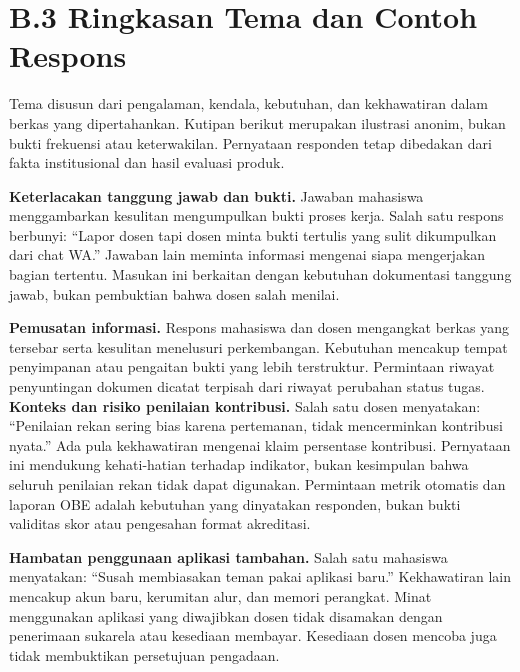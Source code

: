 \documentclass[12pt,a4paper,oneside]{report}
\begin{document}
\section*{B.3 Ringkasan Tema dan Contoh Respons}
Tema disusun dari pengalaman, kendala, kebutuhan, dan kekhawatiran dalam berkas yang dipertahankan. Kutipan berikut merupakan ilustrasi anonim, bukan bukti frekuensi atau keterwakilan. Pernyataan responden tetap dibedakan dari fakta institusional dan hasil evaluasi produk.

\textbf{Keterlacakan tanggung jawab dan bukti.} Jawaban mahasiswa menggambarkan kesulitan mengumpulkan bukti proses kerja. Salah satu respons berbunyi: ``Lapor dosen tapi dosen minta bukti tertulis yang sulit dikumpulkan dari chat WA.'' Jawaban lain meminta informasi mengenai siapa mengerjakan bagian tertentu. Masukan ini berkaitan dengan kebutuhan dokumentasi tanggung jawab, bukan pembuktian bahwa dosen salah menilai.

\textbf{Pemusatan informasi.} Respons mahasiswa dan dosen mengangkat berkas yang tersebar serta kesulitan menelusuri perkembangan. Kebutuhan mencakup tempat penyimpanan atau pengaitan bukti yang lebih terstruktur. Permintaan riwayat penyuntingan dokumen dicatat terpisah dari riwayat perubahan status tugas.
\clearpage
\textbf{Konteks dan risiko penilaian kontribusi.} Salah satu dosen menyatakan: ``Penilaian rekan sering bias karena pertemanan, tidak mencerminkan kontribusi nyata.'' Ada pula kekhawatiran mengenai klaim persentase kontribusi. Pernyataan ini mendukung kehati-hatian terhadap indikator, bukan kesimpulan bahwa seluruh penilaian rekan tidak dapat digunakan. Permintaan metrik otomatis dan laporan OBE adalah kebutuhan yang dinyatakan responden, bukan bukti validitas skor atau pengesahan format akreditasi.

\textbf{Hambatan penggunaan aplikasi tambahan.} Salah satu mahasiswa menyatakan: ``Susah membiasakan teman pakai aplikasi baru.'' Kekhawatiran lain mencakup akun baru, kerumitan alur, dan memori perangkat. Minat menggunakan aplikasi yang diwajibkan dosen tidak disamakan dengan penerimaan sukarela atau kesediaan membayar. Kesediaan dosen mencoba juga tidak membuktikan persetujuan pengadaan.
\end{document}
